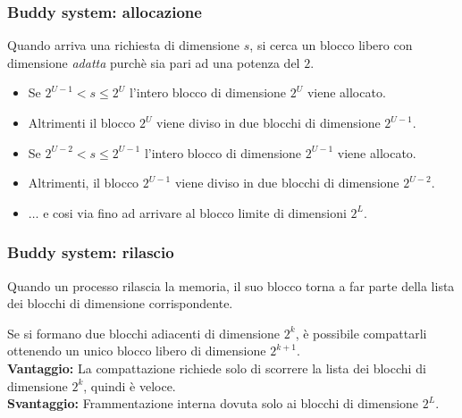 \documentclass[a4paper,12pt, twoside]{report}
\begin{document}
\subsubsection{Buddy system: allocazione}
Quando arriva una richiesta di dimensione $s$, si cerca un blocco libero con dimensione \emph{adatta} purch\`e sia pari
ad una potenza del $2$.
\begin{itemize}
\item Se $2^{U-1} < s \le 2^U$ l'intero blocco di dimensione $2^U$ viene allocato.
\item Altrimenti il blocco $2^U$ viene diviso in due blocchi di dimensione $2^{U-1}$.
\item Se $2^{U-2} < s \le 2^{U-1}$ l'intero blocco di dimensione $2^{U-1}$ viene allocato.
\item Altrimenti, il blocco $2^{U-1}$ viene diviso in due blocchi di dimensione $2^{U-2}$.
\item $\dots$ e cosi via fino ad arrivare al blocco limite di dimensioni $2^L$.
\end{itemize}

\subsubsection{Buddy system: rilascio}
Quando un processo rilascia la memoria, il suo blocco torna a far parte della lista dei blocchi di dimensione
corrispondente. 

Se si formano due blocchi adiacenti di dimensione $2^k$, \`e possibile compattarli ottenendo un unico blocco libero di dimensione $2^{k+1}$. \\
\textbf{Vantaggio:} La compattazione richiede solo di scorrere la lista dei blocchi di dimensione $2^k$, quindi \`e 
veloce. \\
\textbf{Svantaggio:} Frammentazione interna dovuta solo ai blocchi di dimensione $2^L$.
\end{document}
